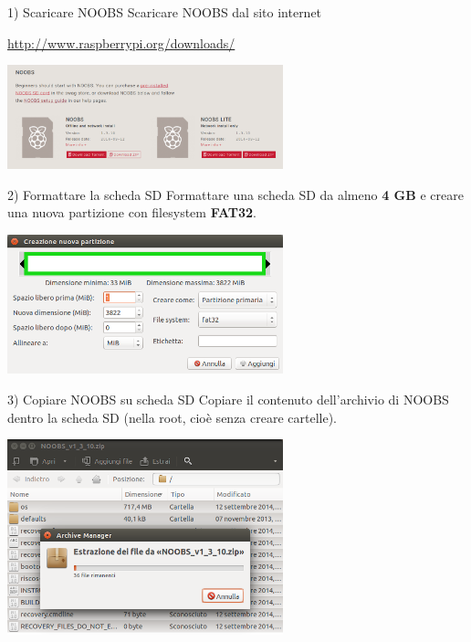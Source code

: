 \documentclass[xcolor=svgnames,11pt]{beamer}
\begin{document}
\begin{frame}{1) Scaricare NOOBS}
Scaricare NOOBS dal sito internet
\begin{center}
\url{http://www.raspberrypi.org/downloads/}

\bigskip
\includegraphics[width=8cm]{guide/1.png}

\end{center}
\end{frame}

\begin{frame}{2) Formattare la scheda SD}
Formattare una scheda SD da almeno \textbf{4 GB} e creare una nuova partizione con filesystem \textbf{FAT32}.

\bigskip
\begin{center}
\includegraphics[width=8cm]{guide/2.png}
\end{center}
\end{frame}

\begin{frame}{3) Copiare NOOBS su scheda SD}
Copiare il contenuto dell'archivio di NOOBS dentro la scheda SD (nella root, cio\`e senza creare cartelle).

\medskip
\begin{center}
\includegraphics[width=8cm]{guide/3.png}
\end{center}
\end{frame}
\end{document}
